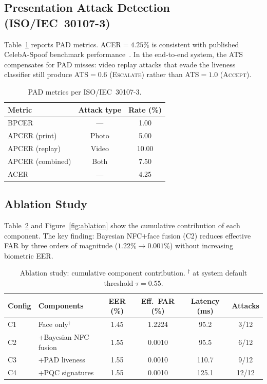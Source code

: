 \documentclass[submission]{sacjsub}
\begin{document}
\subsection{Presentation Attack Detection (ISO/IEC~30107-3)}

Table~\ref{tab:pad} reports PAD metrics. ACER\(=4.25\%\) is consistent
with published CelebA-Spoof benchmark performance~\cite{zhang2020minifasnet}.
In the end-to-end system, the ATS compensates for PAD misses: video
replay attacks that evade the liveness classifier still produce
ATS\(=0.6\) (\textsc{Escalate}) rather than ATS\(=1.0\)
(\textsc{Accept}).

\begin{table}[t]
\caption{PAD metrics per ISO/IEC~30107-3.}
\label{tab:pad}
\begin{tabular}{|l|c|c|}
  \hline
  Metric & Attack type & Rate (\%) \\
  \hline
  BPCER & ---    & 1.00 \\
  APCER (print)    & Photo & 5.00 \\
  APCER (replay)   & Video & 10.00 \\
  APCER (combined) & Both  & 7.50 \\
  ACER  & ---    & 4.25 \\
  \hline
\end{tabular}
\end{table}

\subsection{Ablation Study}\label{sec:ablation}

Table~\ref{tab:ablation} and Figure~\ref{fig:ablation} show the
cumulative contribution of each component. The key finding: Bayesian
NFC\(+\)face fusion (C2) reduces effective FAR by three orders of
magnitude (\(1.22\% \to 0.001\%\)) without increasing biometric EER.

\begin{table}[t]
\caption{Ablation study: cumulative component contribution.
  $^\dagger$ at system default threshold \(\tau{=}0.55\).}
\label{tab:ablation}
\begin{tabular}{|l|l|c|c|c|c|}
  \hline
  Config & Components & EER (\%) & Eff.\ FAR (\%) & Latency (ms)
    & Attacks \\
  \hline
  C1 & Face only$^\dagger$   & 1.45 & 1.2224 & 95.2  & 3/12 \\
  C2 & +Bayesian NFC fusion  & 1.55 & 0.0010 & 95.5  & 6/12 \\
  C3 & +PAD liveness         & 1.55 & 0.0010 & 110.7 & 9/12 \\
  C4 & +PQC signatures       & 1.55 & 0.0010 & 125.1 & 12/12 \\
  \hline
\end{tabular}
\end{table}
\end{document}
